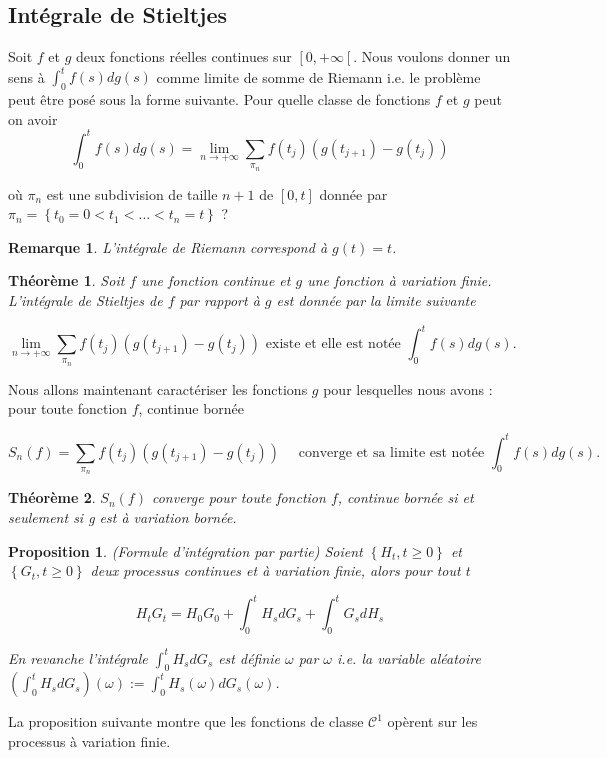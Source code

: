 \documentclass[A4paper,12pt]{report}
\newtheorem{proposition}{Proposition}[chapter]
\newtheorem{theorem}{Th\'eor\`eme}[chapter]
\newtheorem{remark}{Remarque}[chapter]
\begin{document}
\subsection{Intégrale de Stieltjes}
Soit $f$ et $g$ deux fonctions réelles continues sur $\left[0,+\infty\left[\right.\right.$. Nous voulons donner un sens à $\int_{0}^{t} f(s) d g(s)$ comme limite de somme de Riemann i.e. le problème peut être posé sous la forme suivante. Pour quelle classe de fonctions $f$ et $g$ peut on avoir
\begin{equation}\label{E5}
\int_{0}^{t} f(s) d g(s)=\lim_{n \rightarrow+\infty} \sum_{\pi_{n}} f\left(t_{j}\right)\left(g\left(t_{j+1}\right)-g\left(t_{j}\right)\right)
\end{equation}

où $\pi_{n}$ est une subdivision de taille $n+1$ de $[0, t]$ donnée par $\pi_{n}=\left\{t_{0}=0<t_{1}<\ldots<t_{n}=t\right\}$ ?

\begin{remark}
L'intégrale de Riemann correspond à $g(t)=t$.
\end{remark}

\begin{theorem}
Soit $f$ une fonction continue et $g$ une fonction à variation finie. L'intégrale de Stieltjes de $f$ par rapport à $g$ est donnée par la limite suivante

$$
\lim_{n \rightarrow+\infty} \sum_{\pi_{n}} f\left(t_{j}\right)\left(g\left(t_{j+1}\right)-g\left(t_{j}\right)\right) \text { existe et elle est notée } \int_{0}^{t} f(s) d g(s) .
$$
\end{theorem}
Nous allons maintenant caractériser les fonctions $g$ pour lesquelles nous avons : pour toute fonction $f$, continue bornée

$$
S_{n}(f)=\sum_{\pi_{n}} f\left(t_{j}\right)\left(g\left(t_{j+1}\right)-g\left(t_{j}\right)\right) \quad \text { converge et sa limite est notée } \int_{0}^{t} f(s) d g(s) .
$$

\begin{theorem} $S_{n}(f)$ converge pour toute fonction $f$, continue bornée si et seulement si g est à variation bornée.
\end{theorem}

\begin{proposition}\label{prop1} (Formule d'intégration par partie) Soient $\left\{H_{t}, t \geq 0\right\}$ et $\left\{G_{t}, t \geq 0\right\}$ deux processus continues et à variation finie, alors pour tout $t$

\begin{equation} \label{E6}
H_{t} G_{t}=H_{0} G_{0}+\int_{0}^{t} H_{s} d G_{s}+\int_{0}^{t} G_{s} d H_{s}
\end{equation}

En revanche l'intégrale $\int_{0}^{t} H_{s} d G_{s}$ est définie $\omega$ par $\omega$ i.e. la variable aléatoire $\left(\int_{0}^{t} H_{s} d G_{s}\right)(\omega):=\int_{0}^{t} H_{s}(\omega) d G_{s}(\omega)$.
\end{proposition}
La proposition suivante montre que les fonctions de classe $\mathcal{C}^{1}$ opèrent sur les processus à variation finie.
\end{document}
